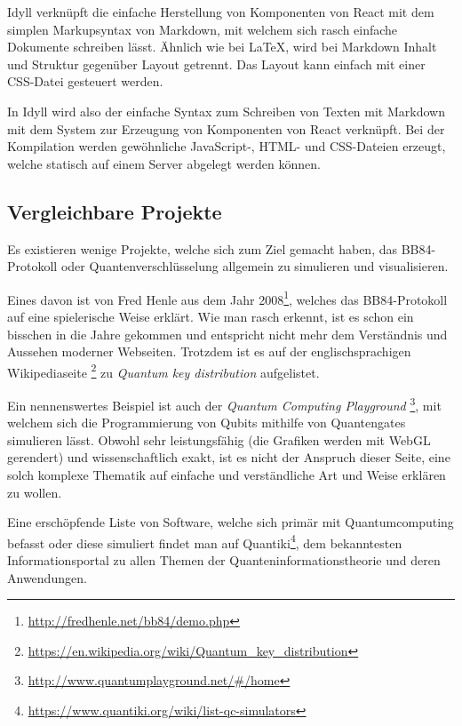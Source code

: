 \documentclass[a4paper,10.2pt,pdftex]{scrartcl}%
\begin{document}
Idyll verknüpft die einfache Herstellung von Komponenten von React mit dem simplen Markupsyntax von Markdown, mit welchem sich rasch einfache Dokumente schreiben lässt. Ähnlich wie bei LaTeX, wird bei Markdown Inhalt und Struktur gegenüber Layout getrennt. Das Layout kann einfach mit einer CSS-Datei gesteuert werden.

In Idyll wird also der einfache Syntax zum Schreiben von Texten mit Markdown mit dem System zur Erzeugung von Komponenten von React verknüpft. Bei der Kompilation werden gewöhnliche JavaScript-, HTML- und CSS-Dateien erzeugt, welche statisch auf einem Server abgelegt werden können.
\newpage
\subsection{Vergleichbare Projekte}
Es existieren wenige Projekte, welche sich zum Ziel gemacht haben, das BB84-Protokoll oder Quantenverschlüsselung allgemein zu simulieren und visualisieren. 

Eines davon ist von Fred Henle aus dem Jahr 2008\footnote{\url{http://fredhenle.net/bb84/demo.php}}, welches das BB84-Protokoll auf eine spielerische Weise erklärt. Wie man rasch erkennt, ist es schon ein bisschen in die Jahre gekommen und entspricht nicht mehr dem Verständnis und Aussehen moderner Webseiten. Trotzdem ist es auf der englischsprachigen Wikipediaseite \footnote{\url{https://en.wikipedia.org/wiki/Quantum_key_distribution}} zu \emph{Quantum key distribution} aufgelistet.

Ein nennenswertes Beispiel ist auch der \emph{Quantum Computing Playground} \footnote{\url{http://www.quantumplayground.net/\#/home}}, mit welchem sich die Programmierung von Qubits mithilfe von Quantengates simulieren lässt. Obwohl sehr leistungsfähig (die Grafiken werden mit WebGL gerendert) und wissenschaftlich exakt, ist es nicht der Anspruch dieser Seite, eine solch komplexe Thematik auf einfache und verständliche Art und Weise erklären zu wollen.

Eine erschöpfende Liste von Software, welche sich primär mit Quantumcomputing befasst oder diese simuliert findet man auf Quantiki\footnote{\url{https://www.quantiki.org/wiki/list-qc-simulators}}, dem bekanntesten Informationsportal zu allen Themen der Quanteninformationstheorie und deren Anwendungen.
\end{document}
